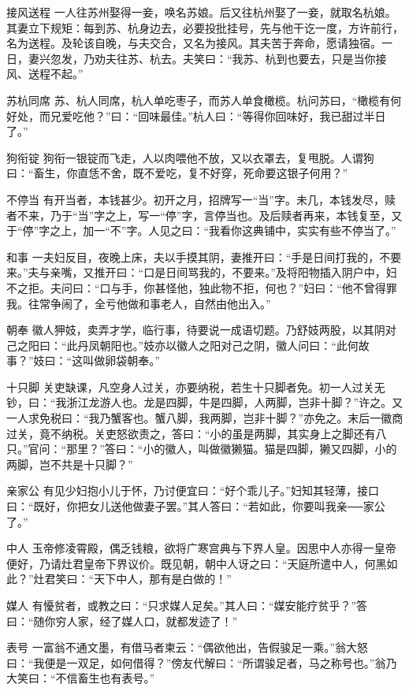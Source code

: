 \documentclass[12pt,UTF8]{ctexbook}
\begin{document}
接风送程
一人往苏州娶得一妾，唤名苏娘。后又往杭州娶了一妾，就取名杭娘。其妻立下规矩：每到苏、杭身边去，必要投批挂号，先与他干讫一度，方许前行，名为送程。及轮该自晚，与夫交合，又名为接风。其夫苦于奔命，愿请独宿。一日，妻兴忽发，乃劝夫往苏、杭去。夫笑曰：“我苏、杭到也要去，只是当你接风、送程不起。”

苏杭同席
苏、杭人同席，杭人单吃枣子，而苏人单食橄榄。杭问苏曰，“橄榄有何好处，而兄爱吃他？”曰：“回味最佳。”杭人曰：“等得你回味好，我已甜过半日了。”

狗衔锭
狗衔一银锭而飞走，人以肉喂他不放，又以衣罩去，复甩脱。人谓狗曰：“畜生，你直恁不舍，既不爱吃，复不好穿，死命要这银子何用？”

不停当
有开当者，本钱甚少。初开之月，招牌写一“当”字。未几，本钱发尽，赎者不来，乃于“当”字之上，写一“停”字，言停当也。及后赎者再来，本钱复至，又于“停”字之上，加一“不”字。人见之曰：“我看你这典铺中，实实有些不停当了。”

和事
一夫妇反目，夜晚上床，夫以手摸其阴，妻推开曰：“手是日间打我的，不要来。”夫与亲嘴，又推开曰：“口是日间骂我的，不要来。”及将阳物插入阴户中，妇不之拒。夫问曰：“口与手，你甚怪他，独此物不拒，何也？”妇曰：“他不曾得罪我。往常争闹了，全亏他做和事老人，自然由他出入。”

朝奉
徽人狎妓，卖弄才学，临行事，待要说一成语切题。乃舒妓两股，以其阴对己之阳曰：“此丹凤朝阳也。”妓亦以徽人之阳对己之阴，徽人问曰：“此何故事？”妓曰：“这叫做卵袋朝奉。”

十只脚
关吏缺课，凡空身人过关，亦要纳税，若生十只脚者免。初一人过关无钞，曰：“我浙江龙游人也。龙是四脚，牛是四脚，人两脚，岂非十脚？”许之。又一人求免税曰：“我乃蟹客也。蟹八脚，我两脚，岂非十脚？”亦免之。末后一徽商过关，竟不纳税。关吏怒欲责之，答曰：“小的虽是两脚，其实身上之脚还有八只。”官问：“那里？”答曰：“小的徽人，叫做徽獭猫。猫是四脚，獭又四脚，小的两脚，岂不共是十只脚？”

亲家公
有见少妇抱小儿于怀，乃讨便宜曰：“好个乖儿子。”妇知其轻薄，接口曰：“既好，你把女儿送他做妻子罢。”其人答曰：“若如此，你要叫我亲──家公了。”

中人
玉帝修凌霄殿，偶乏钱粮，欲将广寒宫典与下界人皇。因思中人亦得一皇帝便好，乃请灶君皇帝下界议价。既见朝，朝中人讶之曰：“天庭所遣中人，何黑如此？”灶君笑曰：“天下中人，那有是白做的！”

媒人
有懮贫者，或教之曰：“只求媒人足矣。”其人曰：“媒安能疗贫乎？”答曰：“随你穷人家，经了媒人口，就都发迹了！”

表号
一富翁不通文墨，有借马者柬云：“偶欲他出，告假骏足一乘。”翁大怒曰：“我便是一双足，如何借得？”傍友代解曰：“所谓骏足者，马之称号也。”翁乃大笑曰：“不信畜生也有表号。”
\end{document}
